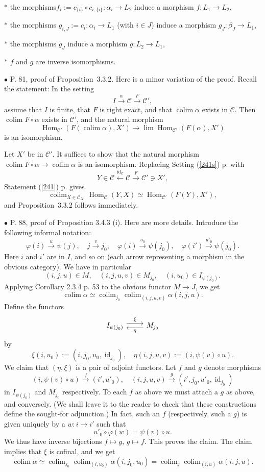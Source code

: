 \documentclass[12pt]{article}
\theoremstyle{remark}
\newcommand{\bu}{\bullet}
\newcommand{\n}{\noindent}
\newcommand{\C}{\mathcal C}
\newcommand{\p}{\varphi}
\newcommand{\pr}{Proposition}
\DeclareMathOperator*{\coli}{colim}
\DeclareMathOperator*{\co}{colim}
\DeclareMathOperator{\id}{id}
\DeclareMathOperator{\h}{Hom}
\begin{document}
\n$*$ the morphisms$f_i:=c_{\{i\}}\circ c_{i,\{i\}}:\alpha_i\to L_2$ induce a morphism $f:L_1\to L_2$, 

\n$*$ the morphisms $g_{i,J}:=c_i:\alpha_i\to L_1$ (with $i\in J$) induce a morphism $g_J:\beta_J\to L_1$, 

\n$*$ the morphisms $g_J$ induce a morphism $g:L_2\to L_1$, 

\n$*$ $f$ and $g$ are inverse isomorphisms. 


\n$\bu$ P. 81, proof of \pr\ 3.3.2. Here is a minor variation of the proof. Recall the statement: In the setting 
$$
I\xrightarrow\alpha\C\xrightarrow F\C', 
$$ 
assume that $I$ is finite, that $F$ is right exact, and that $\co\alpha$ exists in $\C$. Then $\co F\circ\alpha$ exists in $\C'$, and the natural morphism 
$$
\h_{\C'}(F(\co\alpha),X')\to\lim\h_{\C'}(F(\alpha),X')
$$ 
is an isomorphism. 

Let $X'$ be in $\C'$. It suffices to show that the natural morphism $\co F\circ\alpha\to\co\alpha$ is an isomorphism. Replacing Setting (\ref{241s}) p. \pageref{241s} with 
$$
Y\in\C\xleftarrow{\id_\C}\C\xrightarrow{F}\C'\ni X', 
$$ 
Statement (\ref{241}) p. \pageref{241} gives 
$$
\co_{X\in\C_{X'}}\h_\C(Y,X)\simeq\h_{\C'}(F(Y),X'),  
$$  
and \pr\ 3.3.2 follows immediately. 


\n$\bu$ P. 88, proof of Proposition 3.4.3 (i). Here are more details. Introduce the following informal notation: 
$$
\p(i)\overset{u}{\longrightarrow}\psi(j),\quad 
j\overset{v}{\longrightarrow}j_0,\quad 
\p(i)\overset{u_0}{\longrightarrow}\psi(j_0),\quad 
\p(i')\overset{u'_0}{\longrightarrow}\psi(j_0). 
$$ 
Here $i$ and $i'$ are in $I$, and so on (each arrow representing a morphism in the obvious category). We have in particular 
$$
(i,j,u)\in M,\quad(i,j,u,v)\in M_{j_0},\quad(i,u_0)\in I_{\psi(j_0)}. 
$$
Applying Corollary 2.3.4 p. 53 to the obvious functor $M\to J$, we get 
$$
\coli\alpha\simeq
\coli_{j_0}\coli_{(i,j,u,v)}\alpha(i,j,u). 
$$ 
Define the functors 
$$
\begin{tikzcd}
I_{\psi(j_0)}\ar[yshift=0.7ex]{r}{\xi}& M_{j_0}\ar[yshift=-0.7ex]{l}{\eta}
\end{tikzcd}
$$ 
by 
$$
\xi(i,u_0):=(i,j_0,u_0,\id_{j_0}),\quad 
\eta(i,j,u,v):=(i,\psi(v)\circ u). 
$$
We claim that $(\eta,\xi)$ is a pair of adjoint functors. Let $f$ and $g$ denote morphisms 
$$
(i,\psi(v)\circ u)\overset{f}{\to}(i',u'_0),\quad 
(i,j,u,v)\overset{g}{\to}(i',j_0,u'_0,\id_{j_0}) 
$$ 
in $I_{\psi(j_0)}$ and $M_{j_0}$ respectively. To each $f$ as above we must attach a $g$ as above, and conversely. (We shall leave it to the reader to check that these constructions define the sought-for adjunction.) In fact, such an $f$ (respectively, such a $g$) is given uniquely by a $w:i\to i'$ such that 
$$
u'_0\circ\p(w)=\psi(v)\circ u. 
$$ 
We thus have inverse bijections $f\mapsto g$, $g\mapsto f$. This proves the claim. The claim implies that $\xi$ is cofinal, and we get 
$$
\coli\alpha\simeq
\coli_{j_0}\coli_{(i,u_0)}\alpha(i,j_0,u_0)=
\coli_j\coli_{(i,u)}\alpha(i,j,u). 
$$ 
\end{document}
